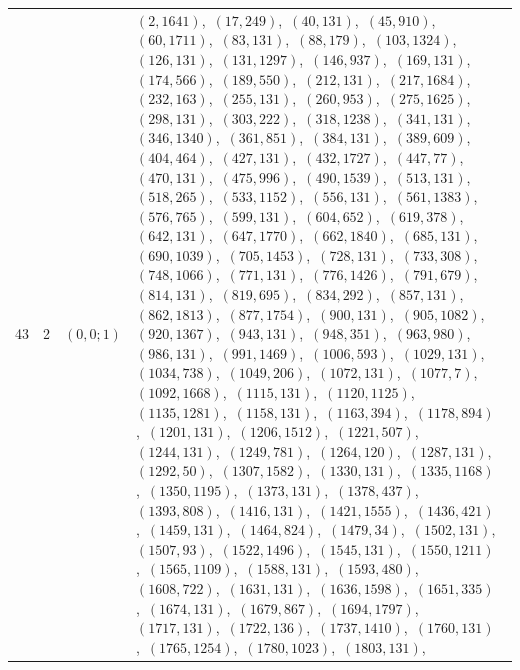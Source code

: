 \documentclass[11pt]{article}
\begin{document}
\begin{longtable}{@{}rrl>{\raggedright\arraybackslash}p{}@{}}
43 & 2 & $(0,0;1)$ & $(2,1641)$,\allowbreak\ $(17,249)$,\allowbreak\ $(40,131)$,\allowbreak\ $(45,910)$,\allowbreak\ $(60,1711)$,\allowbreak\ $(83,131)$,\allowbreak\ $(88,179)$,\allowbreak\ $(103,1324)$,\allowbreak\ $(126,131)$,\allowbreak\ $(131,1297)$,\allowbreak\ $(146,937)$,\allowbreak\ $(169,131)$,\allowbreak\ $(174,566)$,\allowbreak\ $(189,550)$,\allowbreak\ $(212,131)$,\allowbreak\ $(217,1684)$,\allowbreak\ $(232,163)$,\allowbreak\ $(255,131)$,\allowbreak\ $(260,953)$,\allowbreak\ $(275,1625)$,\allowbreak\ $(298,131)$,\allowbreak\ $(303,222)$,\allowbreak\ $(318,1238)$,\allowbreak\ $(341,131)$,\allowbreak\ $(346,1340)$,\allowbreak\ $(361,851)$,\allowbreak\ $(384,131)$,\allowbreak\ $(389,609)$,\allowbreak\ $(404,464)$,\allowbreak\ $(427,131)$,\allowbreak\ $(432,1727)$,\allowbreak\ $(447,77)$,\allowbreak\ $(470,131)$,\allowbreak\ $(475,996)$,\allowbreak\ $(490,1539)$,\allowbreak\ $(513,131)$,\allowbreak\ $(518,265)$,\allowbreak\ $(533,1152)$,\allowbreak\ $(556,131)$,\allowbreak\ $(561,1383)$,\allowbreak\ $(576,765)$,\allowbreak\ $(599,131)$,\allowbreak\ $(604,652)$,\allowbreak\ $(619,378)$,\allowbreak\ $(642,131)$,\allowbreak\ $(647,1770)$,\allowbreak\ $(662,1840)$,\allowbreak\ $(685,131)$,\allowbreak\ $(690,1039)$,\allowbreak\ $(705,1453)$,\allowbreak\ $(728,131)$,\allowbreak\ $(733,308)$,\allowbreak\ $(748,1066)$,\allowbreak\ $(771,131)$,\allowbreak\ $(776,1426)$,\allowbreak\ $(791,679)$,\allowbreak\ $(814,131)$,\allowbreak\ $(819,695)$,\allowbreak\ $(834,292)$,\allowbreak\ $(857,131)$,\allowbreak\ $(862,1813)$,\allowbreak\ $(877,1754)$,\allowbreak\ $(900,131)$,\allowbreak\ $(905,1082)$,\allowbreak\ $(920,1367)$,\allowbreak\ $(943,131)$,\allowbreak\ $(948,351)$,\allowbreak\ $(963,980)$,\allowbreak\ $(986,131)$,\allowbreak\ $(991,1469)$,\allowbreak\ $(1006,593)$,\allowbreak\ $(1029,131)$,\allowbreak\ $(1034,738)$,\allowbreak\ $(1049,206)$,\allowbreak\ $(1072,131)$,\allowbreak\ $(1077,7)$,\allowbreak\ $(1092,1668)$,\allowbreak\ $(1115,131)$,\allowbreak\ $(1120,1125)$,\allowbreak\ $(1135,1281)$,\allowbreak\ $(1158,131)$,\allowbreak\ $(1163,394)$,\allowbreak\ $(1178,894)$,\allowbreak\ $(1201,131)$,\allowbreak\ $(1206,1512)$,\allowbreak\ $(1221,507)$,\allowbreak\ $(1244,131)$,\allowbreak\ $(1249,781)$,\allowbreak\ $(1264,120)$,\allowbreak\ $(1287,131)$,\allowbreak\ $(1292,50)$,\allowbreak\ $(1307,1582)$,\allowbreak\ $(1330,131)$,\allowbreak\ $(1335,1168)$,\allowbreak\ $(1350,1195)$,\allowbreak\ $(1373,131)$,\allowbreak\ $(1378,437)$,\allowbreak\ $(1393,808)$,\allowbreak\ $(1416,131)$,\allowbreak\ $(1421,1555)$,\allowbreak\ $(1436,421)$,\allowbreak\ $(1459,131)$,\allowbreak\ $(1464,824)$,\allowbreak\ $(1479,34)$,\allowbreak\ $(1502,131)$,\allowbreak\ $(1507,93)$,\allowbreak\ $(1522,1496)$,\allowbreak\ $(1545,131)$,\allowbreak\ $(1550,1211)$,\allowbreak\ $(1565,1109)$,\allowbreak\ $(1588,131)$,\allowbreak\ $(1593,480)$,\allowbreak\ $(1608,722)$,\allowbreak\ $(1631,131)$,\allowbreak\ $(1636,1598)$,\allowbreak\ $(1651,335)$,\allowbreak\ $(1674,131)$,\allowbreak\ $(1679,867)$,\allowbreak\ $(1694,1797)$,\allowbreak\ $(1717,131)$,\allowbreak\ $(1722,136)$,\allowbreak\ $(1737,1410)$,\allowbreak\ $(1760,131)$,\allowbreak\ $(1765,1254)$,\allowbreak\ $(1780,1023)$,\allowbreak\ $(1803,131)$,\allowbreak\ 
\end{longtable}
\end{document}

